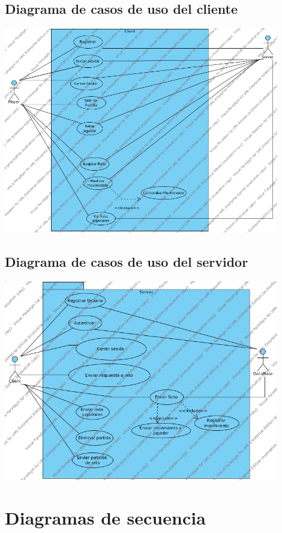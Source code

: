 \documentclass[a4paper,11pt,oneside]{article}
\begin{document}
\subsection{Diagrama de casos de uso del cliente}

\includegraphics[width=0.9\textwidth]{img/cdu_Cliente.png}\\[1cm]

\subsection{Diagrama de casos de uso del servidor}

\includegraphics[width=0.9\textwidth]{img/cdu_Servidor.png}\\[1cm]

\section{Diagramas de secuencia}
\end{document}
